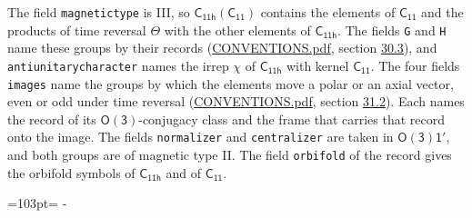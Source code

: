 \documentclass[10pt,a4paper]{article}
\newcommand{\needspace}[1]{\par\penalty-100\begingroup\dimen0=#1\relax\dimen2=\pagegoal
  \advance\dimen2-\pagetotal\ifdim\dimen0>\dimen2\relax\ifdim\dimen2>0pt\vfil\break\fi\fi
  \endgroup}
\numberwithin{equation}{section}
\newcommand{\grp}[1]{\mathsf{#1}}
\begin{document}
The field \texttt{magnetictype} is III, so $\grp{C_{11h}}(\grp{C_{11}})$ contains the elements of $\grp{C_{11}}$ and the products of time reversal $\varTheta$ with the other elements of $\grp{C_{11h}}$. The fields \texttt{G} and \texttt{H} name these groups by their records (\href{../../CONVENTIONS.pdf}{CONVENTIONS.pdf}, section \href{../../CONVENTIONS.pdf\#conv.30.3}{30.3}), and \texttt{antiunitarycharacter} names the irrep $\chi$ of $\grp{C_{11h}}$ with kernel $\grp{C_{11}}$. The four fields \texttt{images} name the groups by which the elements move a polar or an axial vector, even or odd under time reversal (\href{../../CONVENTIONS.pdf}{CONVENTIONS.pdf}, section \href{../../CONVENTIONS.pdf\#conv.31.2}{31.2}). Each names the record of its $\grp{O(3)}$-conjugacy class and the frame that carries that record onto the image. The fields \texttt{normalizer} and \texttt{centralizer} are taken in $\grp{O(3)1'}$, and both groups are of magnetic type II. The field \texttt{orbifold} of the record gives the orbifold symbols of $\grp{C_{11h}}$ and of $\grp{C_{11}}$.
\needspace{103pt}
\end{document}
